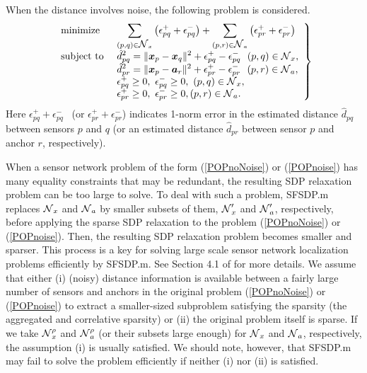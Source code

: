 \documentclass[12pt]{article}
\def\a{\mbox{\boldmath $a$}}
\def\x{\mbox{\boldmath $x$}}
\def\NC{\mbox{$\cal N$}}
\begin{document}
When the distance involves noise, the following problem is considered. 
\begin{equation} 
\left.
\begin{array}{ll}
\mbox{minimize }  & 
\displaystyle \sum_{(p,q) \in \NC_x} \left( \epsilon_{pq}^+ + \epsilon_{pq}^- \right) 
  + \sum_{(p,r) \in \NC_a} \left( \epsilon_{pr}^+  + \epsilon_{pr}^- \right) \\ 
\mbox{subject to } & 
\displaystyle  \hat{d}_{pq}^2  = 
\|\x_p - \x_q\| ^2 
+ \epsilon_{pq}^+ - \epsilon_{pq}^-  \ \  
 (p,q) \in \NC_x, \\
& \displaystyle  \hat{d}_{pr}^2 = 
 \|\x_p - \a_r\| ^2 
 + \epsilon_{pr}^+ - \epsilon_{pr}^- \  \   (p,r) \in \NC_a, \\
&\displaystyle  \epsilon_{pq}^+ \geq 0, \ \epsilon_{pq}^- \geq 0, \ (p,q) \in \NC_x, \\
& \displaystyle  \epsilon_{pr}^+ \geq 0, \ \epsilon_{pr}^- \geq 0,
(p,r) \in \NC_a.
\end{array}
\right\}
\label{POPnoise}
\end{equation} 
Here $\epsilon_{pq}^+ + \epsilon_{pq}^-$  \ (or $\epsilon_{pr}^+ + \epsilon_{pr}^-$) indicates 
 1-norm error in the estimated distance $\hat{d}_{pq}$ between
sensors $p$ and $q$ (or an estimated distance $\hat{d}_{pr}$ between
sensor $p$ and anchor $r$, respectively). 


When a sensor network problem of the form (\ref{POPnoNoise}) or (\ref{POPnoise})
has many  equality constraints that may be redundant,   
the resulting SDP relaxation problem can be too large to solve. 
To deal with such a problem, SFSDP.m replaces $\NC_x$ and $\NC_a$
by smaller subsets of them,  $\NC'_x$ and $\NC'_a$, respectively, before applying the sparse SDP 
relaxation to the problem (\ref{POPnoNoise}) or (\ref{POPnoise}). Then,
 the resulting SDP relaxation problem becomes smaller and sparser. 
This process  is a key for solving  large scale sensor network localization problems 
efficiently by SFSDP.m.  See Section 4.1 of \cite{KIM08} for 
more details. 
We assume that either 
(i) (noisy) distance information is available between a fairly large number of sensors and anchors 
in the original problem  (\ref{POPnoNoise}) or (\ref{POPnoise}) 
to extract a smaller-sized subproblem satisfying the sparsity (the aggregated and 
correlative sparsity) or (ii) the original problem itself is sparse.  If we take 
$\NC^{\rho}_x$ and $\NC^{\rho}_a$ (or their subsets large enough) for $\NC_x$ and $\NC_a$, 
respectively,  the assumption (i) is usually satisfied. We should note, however, that
 SFSDP.m may fail to solve the problem efficiently if neither (i) nor (ii) is satisfied. 
\end{document}
